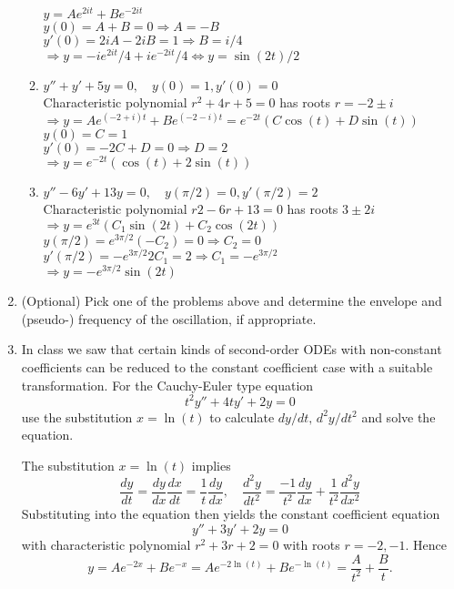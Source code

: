 \documentclass[10pt,a4paper]{letter}
\begin{document}
\begin{enumerate}
\begin{enumerate}
$y = Ae^{2it} + Be^{-2it} $\\
$y(0) = A+B = 0 \Rightarrow A = - B $\\
$y'(0) = 2iA - 2iB = 1 \Rightarrow B = i/4$\\
$\Rightarrow y = -ie^{2it}/4 + ie^{-2it}/4 \Leftrightarrow y = \sin(2t)/2 $
\item $y'' + y' + 5y = 0, \quad y(0) = 1, y'(0) = 0$ \\
Characteristic polynomial $r^2 + 4r + 5 =0$ has roots $r = -2 \pm i$ \\
$\Rightarrow y = A e^{(-2+i)t} + Be^{(-2-i)t} = e^{-2t}(C \cos(t) + D \sin(t)) $\\
$y(0) = C = 1$ \\
$y'(0) = -2C + D = 0 \Rightarrow D = 2$ \\
$\Rightarrow y = e^{-2t}(\cos(t) + 2 \sin(t)) $
\item $y'' - 6y' + 13y = 0, \quad y(\pi/2) = 0, y'(\pi/2) = 2$ \\
Characteristic polynomial $r2 - 6r + 13 =0$ has roots $3 \pm 2i$ \\
$\Rightarrow y = e^{3t} (C_1 \sin(2t) + C_2 \cos(2t))$ \\
$y(\pi/2) = e^{3 \pi/2} (-C_2) = 0 \Rightarrow C_2 = 0 $ \\
$y'(\pi/2) = -e^{3 \pi/2} 2 C_1 = 2  \Rightarrow C_1 = -e^{3 \pi/2} $ \\
$\Rightarrow y = -e^{3 \pi/2} \sin(2t)$

\end{enumerate}
\item (Optional) Pick one of the problems above and determine the envelope and (pseudo-) frequency of the oscillation, if appropriate.
\item In class we saw that certain kinds of second-order ODEs with non-constant coefficients can be reduced to the constant coefficient case with a suitable transformation. For the Cauchy-Euler type equation
\[ t^2 y'' + 4ty' + 2y =0 \]
use the substitution $x = \ln(t)$ to calculate $dy/dt, \, d^2 y/d t^2$ and solve the equation.

\vspace{2em}
The substitution $x = \ln(t)$ implies
\[ \frac{dy}{dt} = \frac{dy}{dx}\frac{dx}{dt} = \frac{1}{t}\frac{dy}{dx}, \quad \frac{d^2 y}{dt^2} = \frac{-1}{t^2}\frac{dy}{dx} + \frac{1}{t^2}\frac{d^2y}{dx^2} \]
Substituting into the equation then yields the constant coefficient equation
\[ y''+3y' +2y =0\]
with characteristic polynomial $r^2 + 3r +2 =0$ with roots $r = -2,-1.$ Hence
\[ y = Ae^{-2x} + Be^{-x} = A e^{-2 \ln(t)} + Be^{-\ln(t)} = \frac{A}{t^2} + \frac{B}{t}. \]

\end{enumerate}
\end{document}
